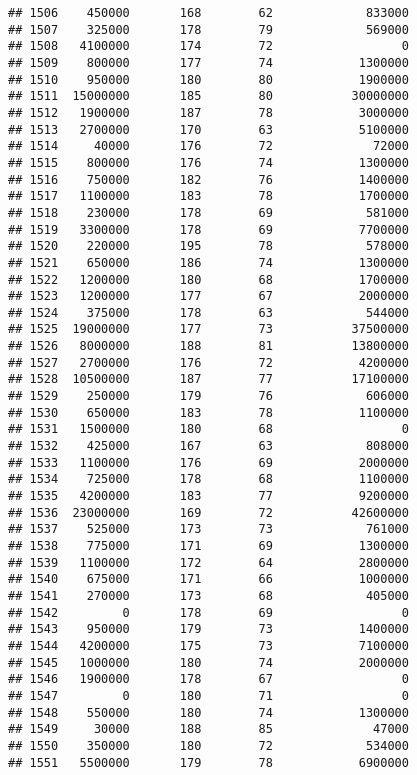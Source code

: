 \documentclass[
]{article}
\begin{document}
\begin{verbatim}
## 1506    450000       168        62             833000
## 1507    325000       178        79             569000
## 1508   4100000       174        72                  0
## 1509    800000       177        74            1300000
## 1510    950000       180        80            1900000
## 1511  15000000       185        80           30000000
## 1512   1900000       187        78            3000000
## 1513   2700000       170        63            5100000
## 1514     40000       176        72              72000
## 1515    800000       176        74            1300000
## 1516    750000       182        76            1400000
## 1517   1100000       183        78            1700000
## 1518    230000       178        69             581000
## 1519   3300000       178        69            7700000
## 1520    220000       195        78             578000
## 1521    650000       186        74            1300000
## 1522   1200000       180        68            1700000
## 1523   1200000       177        67            2000000
## 1524    375000       178        63             544000
## 1525  19000000       177        73           37500000
## 1526   8000000       188        81           13800000
## 1527   2700000       176        72            4200000
## 1528  10500000       187        77           17100000
## 1529    250000       179        76             606000
## 1530    650000       183        78            1100000
## 1531   1500000       180        68                  0
## 1532    425000       167        63             808000
## 1533   1100000       176        69            2000000
## 1534    725000       178        68            1100000
## 1535   4200000       183        77            9200000
## 1536  23000000       169        72           42600000
## 1537    525000       173        73             761000
## 1538    775000       171        69            1300000
## 1539   1100000       172        64            2800000
## 1540    675000       171        66            1000000
## 1541    270000       173        68             405000
## 1542         0       178        69                  0
## 1543    950000       179        73            1400000
## 1544   4200000       175        73            7100000
## 1545   1000000       180        74            2000000
## 1546   1900000       178        67                  0
## 1547         0       180        71                  0
## 1548    550000       180        74            1300000
## 1549     30000       188        85              47000
## 1550    350000       180        72             534000
## 1551   5500000       179        78            6900000

\end{verbatim}
\end{document}
